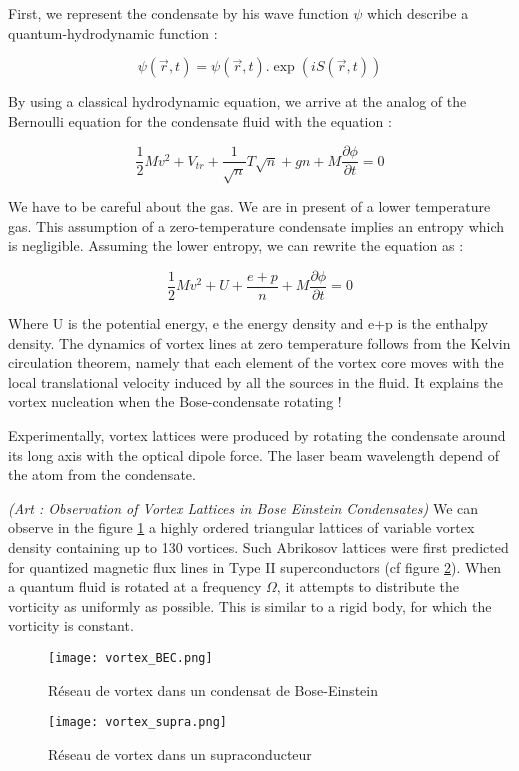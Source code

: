 \documentclass[a4paper]{article}
\begin{document}
\begin{multicols}{2}
First, we represent the condensate by his wave function $\psi$ which describe a quantum-hydrodynamic function :

\[\psi(\vec{r}, t) = \psi(\vec{r}, t).\exp(i S(\vec{r}, t))\]

By using a classical hydrodynamic equation, we arrive at the analog of the Bernoulli equation for the condensate fluid with the equation :

\[\frac{1}{2}Mv^2 + V_{tr} + \frac{1}{\sqrt{n}}T\sqrt{n} + gn + M\frac{\partial\phi}{\partial t} = 0\]

We have to be careful about the gas. We are in present of a lower temperature gas. This assumption of a zero-temperature condensate implies an entropy which is negligible.
Assuming the lower entropy, we can rewrite the equation as :

\[\frac{1}{2}Mv^2 + U + \frac{e+p}{n} + M\frac{\partial \phi}{\partial t} = 0\]

Where U is the potential energy, e the energy density and e+p is the enthalpy density.
The dynamics of vortex lines at zero temperature follows from the Kelvin circulation theorem, namely that each element of the vortex core moves with the local translational velocity induced by all the sources in the fluid. It explains the vortex nucleation when the Bose-condensate rotating !

Experimentally, vortex lattices were produced by rotating the condensate around its long axis with the optical dipole force. The laser beam wavelength depend of the atom from the condensate. 

\textit{(Art : Observation of Vortex Lattices in Bose Einstein Condensates)}
We can observe in the figure \ref{fig1:v_BEC} a highly ordered triangular lattices of variable vortex density containing up to 130 vortices. Such Abrikosov lattices were first predicted for quantized magnetic flux lines in Type II superconductors (cf figure \ref{fig2:v_supra}). 
When a quantum fluid is rotated at a frequency $\Omega$, it attempts to distribute the vorticity as uniformly as possible. This is similar to a rigid body, for which the vorticity is constant.


\begin{figure}[H]
 \centering
 \texttt{[image: vortex\_BEC.png]}
 \caption{\label{fig1:v_BEC}Réseau de vortex dans un condensat de Bose-Einstein}
\end{figure}


\begin{figure}[H]
 \centering
 \texttt{[image: vortex\_supra.png]}
 \caption{\label{fig2:v_supra}Réseau de vortex dans un supraconducteur}
\end{figure}



\end{multicols}
\end{document}
